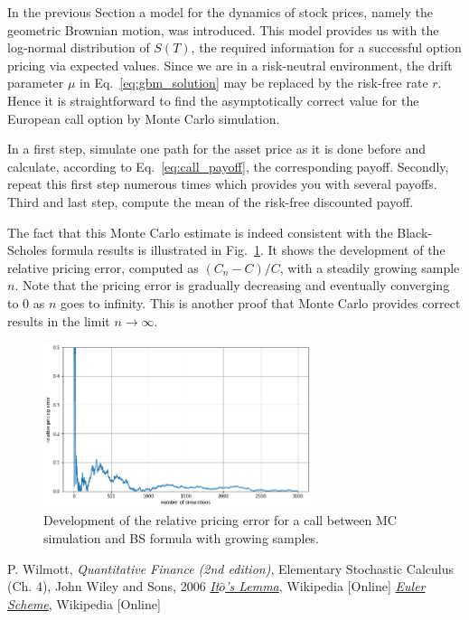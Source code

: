 In the previous Section a model for the dynamics of stock prices, namely the geometric Brownian motion, was introduced. This model provides us with the log-normal distribution of $S(T)$, the required information for a successful option pricing via expected values. Since we are in a risk-neutral environment, the drift parameter $\mu$ in Eq.~\ref{eq:gbm_solution} may be replaced by the risk-free rate $r$. Hence it is straightforward to find the asymptotically correct value for the European call option by Monte Carlo simulation. 

In a first step, simulate one path for the asset price as it is done before and calculate, according to Eq.~\ref{eq:call_payoff}, the corresponding payoff. Secondly, repeat this first step numerous times which provides you with several payoffs. Third and last step, compute the mean of the risk-free discounted payoff. 

The fact that this Monte Carlo estimate is indeed consistent with the Black-Scholes formula results is illustrated in Fig.~\ref{fig:error_BS}. It shows the development of the relative pricing error, computed as $(C_n − C)/C$, with a steadily growing sample $n$. Note that the pricing error is gradually decreasing and eventually converging to 0 as $n$ goes to infinity. This is another proof that Monte Carlo provides correct results in the limit $n\rightarrow\infty$.

\begin{figure}[htb]
	\centering
	\includegraphics[width=0.7\textwidth]{figures/call_pricing_error.png}
	\caption{Development of the relative pricing error for a call between MC simulation and BS formula with growing samples.}
	\label{fig:error_BS}
\end{figure}

\begin{thebibliography}{9}
 P. Wilmott, \emph{Quantitative Finance (2nd edition)}, Elementary Stochastic Calculus (Ch. 4), John Wiley and Sons, 2006 
\href{https://en.wikipedia.org/wiki/It\%C3\%B4\%27s_lemma}{\emph{It$\hat{o}$'s Lemma}}, Wikipedia [Online]
 \href{https://en.wikipedia.org/wiki/Euler_method}{\emph{Euler Scheme}}, Wikipedia [Online]
\end{thebibliography}









